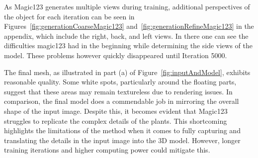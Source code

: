 As Magic123 generates multiple views during training, additional perspectives of the object for each iteration can be seen in Figures~\ref{fig:generationCoarseMagic123} and~\ref{fig:generationRefineMagic123} in the appendix, which include the right, back, and left views. In there one can see the difficulties magic123 had in the beginning while determining the side views of the model. These problems however quickly disappeared until Iteration 5000. 

The final mesh, as illustrated in part (a) of Figure~\ref{fig:inputAndModel}, exhibits reasonable quality. Some white spots, particularly around the floating parts, suggest that these areas may remain textureless due to rendering issues. In comparison, the final model does a commendable job in mirroring the overall shape of the input image. Despite this, it becomes evident that Magic123 struggles to replicate the complex details of the plants. This shortcoming highlights the limitations of the method when it comes to fully capturing and translating the details in the input image into the 3D model. However, longer training iterations and higher computing power could mitigate this.


